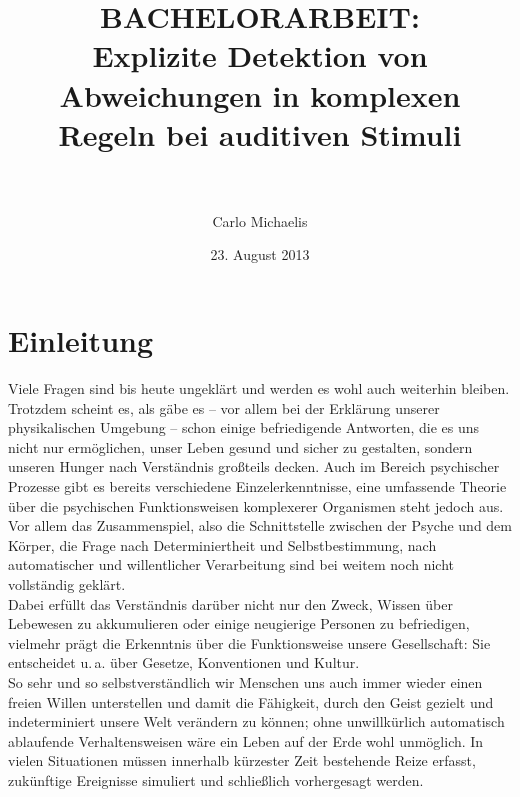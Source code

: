 \documentclass[doc,a4paper,12pt]{apa6}
\title{BACHELORARBEIT:\\ Explizite Detektion von Abweichungen in komplexen Regeln bei auditiven Stimuli\\ \ }
\author{Carlo Michaelis}
\date{23. August 2013}
\affiliation{Matr.-Nr.: 2259062\\ Institut für Psychologie, Universität Leipzig\\ \ }
\begin{document}
\maketitle
\newpage

\setcounter{tocdepth}{2}
\tableofcontents
\newpage

\section{Einleitung}

Viele Fragen sind bis heute ungeklärt und werden es wohl auch weiterhin bleiben. Trotzdem scheint es, als gäbe es – vor allem bei der Erklärung unserer physikalischen Umgebung – schon einige befriedigende Antworten, die es uns nicht nur ermöglichen, unser Leben gesund und sicher zu gestalten, sondern unseren Hunger nach Verständnis großteils decken. Auch im Bereich psychischer Prozesse gibt es bereits verschiedene Einzelerkenntnisse, eine umfassende Theorie über die psychischen Funktionsweisen komplexerer Organismen steht jedoch aus. Vor allem das Zusammenspiel, also die Schnittstelle zwischen der Psyche und dem Körper, die Frage nach Determiniertheit und Selbstbestimmung, nach automatischer und willentlicher Verarbeitung sind bei weitem noch nicht vollständig geklärt.\\
Dabei erfüllt das Verständnis darüber nicht nur den Zweck, Wissen über Lebewesen zu akkumulieren oder einige neugierige Personen zu befriedigen, vielmehr prägt die Erkenntnis über die Funktionsweise unsere Gesellschaft: Sie entscheidet u.\,a. über Gesetze, Konventionen und Kultur.\\
So sehr und so selbstverständlich wir Menschen uns auch immer wieder einen freien Willen unterstellen und damit die Fähigkeit, durch den Geist gezielt und indeterminiert unsere Welt verändern zu können; ohne unwillkürlich automatisch ablaufende Verhaltensweisen wäre ein Leben auf der Erde wohl unmöglich. In vielen Situationen müssen innerhalb kürzester Zeit bestehende Reize erfasst, zukünftige Ereignisse simuliert und schließlich vorhergesagt werden.
\end{document}
